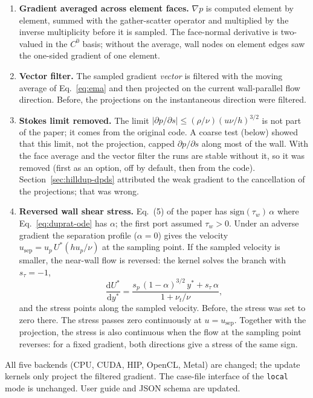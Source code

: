 \documentclass[11pt,a4paper]{article}
\newcommand{\code}[1]{\texttt{#1}}
\newcommand{\up}{u_p}
\newcommand{\dpds}{\partial p/\partial s}
\begin{document}
\begin{enumerate}
  \item \textbf{Gradient averaged across element faces.} $\nabla p$ is
    computed element by element, summed with the gather-scatter operator and
    multiplied by the inverse multiplicity before it is sampled. The
    face-normal derivative is two-valued in the $C^0$ basis; without the
    average, wall nodes on element edges saw the one-sided gradient of one
    element.
  \item \textbf{Vector filter.} The sampled gradient \emph{vector} is
    filtered with the moving average of Eq.~\eqref{eq:ema} and then projected
    on the current wall-parallel flow direction. Before, the projections on
    the instantaneous direction were filtered.
  \item \textbf{Stokes limit removed.} The limit
    $|\dpds| \le (\rho/\nu)(u\nu/h)^{3/2}$ is not part of the paper; it comes
    from the original code. A coarse test (below) showed that this limit, not
    the projection, capped $\dpds$ along most of the wall. With the face
    average and the vector filter the runs are stable without it, so it was
    removed (first as an option, off by default, then from the code). Section~\ref{sec:hilldup-dpds} attributed the
    weak gradient to the cancellation of the projections; that was wrong.
  \item \textbf{Reversed wall shear stress.} Eq.~(5) of the paper has
    $\mathrm{sign}(\tau_w)\,\alpha$ where Eq.~\eqref{eq:duprat-ode} has
    $\alpha$; the first port assumed $\tau_w > 0$. Under an adverse gradient
    the separation profile ($\alpha = 0$) gives the velocity
    $u_\mathrm{sep} = \up\,U^*(h\up/\nu)$ at the sampling point. If the
    sampled velocity is smaller, the near-wall flow is reversed: the kernel
    solves the branch with $s_\tau = -1$,
    \begin{equation}
      \frac{\mathrm{d}U^*}{\mathrm{d}y^*} =
        \frac{s_p\,(1-\alpha)^{3/2}\,y^* + s_\tau\,\alpha}{1 + \nu_t/\nu},
      \label{eq:duprat-ode-sign}
    \end{equation}
    and the stress points along the sampled velocity. Before, the stress
    was set to zero there. The stress passes zero continuously at
    $u = u_\mathrm{sep}$. Together with the projection, the stress is also
    continuous when the flow at the sampling point reverses: for a fixed
    gradient, both directions give a stress of the same sign.
\end{enumerate}
All five backends (CPU, CUDA, HIP, OpenCL, Metal) are changed; the update
kernels only project the filtered gradient. The case-file interface of the
\code{local} mode is unchanged. User guide and JSON schema are updated.
\end{document}
